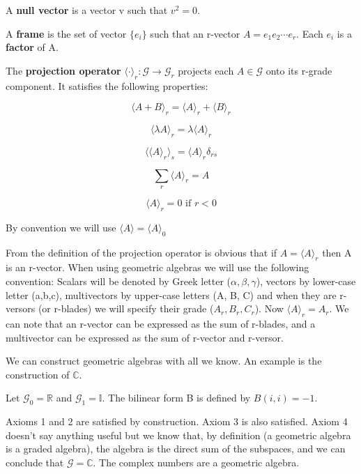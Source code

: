 \begin{definition}
A \textbf{null vector} is a vector v such that $v^2 = 0$.
\end{definition}

\begin{definition}
A \textbf{frame} is the set of vector $\{e_i\}$ such that an r-vector $A = e_1 e_2 \dotsm e_r$. Each $e_i$ is a \textbf{factor} of A.
\end{definition}

\begin{definition}
The \textbf{projection operator} $ \langle \cdot \rangle_r: \mathcal{G} \rightarrow \mathcal{G}_r$ projects each $A \in \mathcal{G}$ onto its r-grade component. It satisfies the following properties:

$$\langle A + B \rangle_r = \langle A \rangle_r + \langle B \rangle_r$$

$$\langle \lambda A \rangle_r = \lambda \langle A \rangle_r$$

$$\langle \langle A \rangle_r  \rangle_s = \langle A \rangle_r \delta_{rs}$$

$$\sum_r \langle A \rangle_r = A$$

$$\langle A \rangle_r = 0 \mbox{ if } r < 0$$

By convention we will use $ \langle A \rangle = \langle A \rangle_0$

\end{definition}

From the definition of the projection operator is obvious that if $A = \langle A \rangle_r$ then A is an r-vector. When using geometric algebras we will use the following convention: Scalars will be denoted by Greek letter ($\alpha, \beta, \gamma$), vectors by lower-case letter (a,b,c), multivectors by upper-case letters (A, B, C) and when they are r-versors (or r-blades) we will specify their grade ($A_r, B_r, C_r$). Now $\langle A \rangle_r = A_r$. We can note that an r-vector can be expressed as the sum of r-blades, and a multivector can be expressed as the sum of r-vector and r-versor.

We can construct geometric algebras with all we know. An example is the construction of $\mathbb{C}$.

\begin{example}
Let $\mathcal{G}_0 = \mathbb{R}$ and $\mathcal{G}_1 = \mathbb{I}$. The bilinear form B is defined by $B(i,i) = -1$. 

Axioms 1 and 2 are satisfied by construction. Axiom 3 is also satisfied. Axiom 4 doesn't say anything useful but we know that, by definition (a geometric algebra is a graded algebra), the algebra is the direct sum of the subspaces, and we can conclude that $\mathcal{G} = \mathbb{C}$. The complex numbers are a geometric algebra. 
\end{example}

